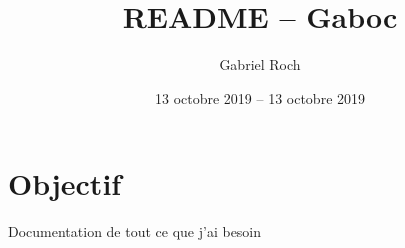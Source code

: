 


\title{README -- Gaboc}
\author{Gabriel Roch}
\date{13 octobre 2019 -- 13 octobre 2019}



\maketitle
\tableofcontents

\section{Objectif}

Documentation de tout ce que j'ai besoin



